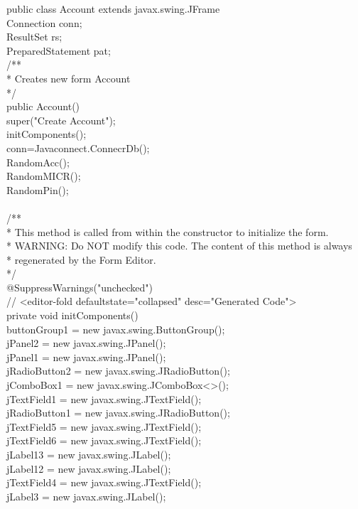 public class Account extends javax.swing.JFrame {\\
Connection conn;\\
ResultSet rs;\\
PreparedStatement pat;\\
/**\\
* Creates new form Account\\
*/\\
public Account() {\\
super("Create Account");\\
initComponents();\\
conn=Javaconnect.ConnecrDb();\\
RandomAcc();\\
RandomMICR();\\
RandomPin();\\
}\\
/**\\
* This method is called from within the constructor to initialize the form.\\
* WARNING: Do NOT modify this code. The content of this method is always\\
* regenerated by the Form Editor.\\
*/\\
@SuppressWarnings("unchecked")\\
// <editor-fold defaultstate="collapsed" desc="Generated Code">\\
private void initComponents() {\\
buttonGroup1 = new javax.swing.ButtonGroup();\\
jPanel2 = new javax.swing.JPanel();\\
jPanel1 = new javax.swing.JPanel();\\
jRadioButton2 = new javax.swing.JRadioButton();\\
jComboBox1 = new javax.swing.JComboBox<>();\\
jTextField1 = new javax.swing.JTextField();\\
jRadioButton1 = new javax.swing.JRadioButton();\\
jTextField5 = new javax.swing.JTextField();\\
jTextField6 = new javax.swing.JTextField();\\
jLabel13 = new javax.swing.JLabel();\\
jLabel12 = new javax.swing.JLabel();\\
jTextField4 = new javax.swing.JTextField();\\
jLabel3 = new javax.swing.JLabel();\\
}}
